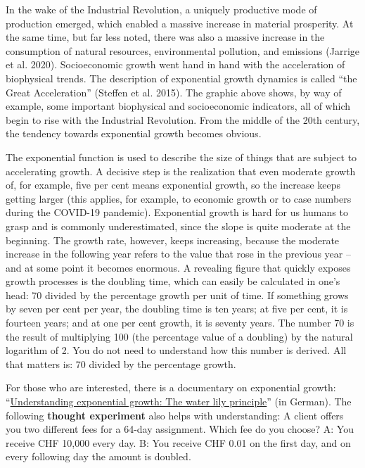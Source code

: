 \documentclass[
  british,
  a4paper,
  DIV=11,
  numbers=noendperiod,
  oneside,
  openany]{scrreprt}
\begin{document}
In the wake of the Industrial Revolution, a uniquely productive mode of
production emerged, which enabled a massive increase in material
prosperity. At the same time, but far less noted, there was also a
massive increase in the consumption of natural resources, environmental
pollution, and emissions (Jarrige et al. 2020). Socioeconomic growth
went hand in hand with the acceleration of biophysical trends. The
description of exponential growth dynamics is called ``the Great
Acceleration'' (Steffen et al. 2015). The graphic above shows, by way of
example, some important biophysical and socioeconomic indicators, all of
which begin to rise with the Industrial Revolution. From the middle of
the 20th century, the tendency towards exponential growth becomes
obvious.

\begin{tcolorbox}[enhanced jigsaw, arc=.35mm, bottomrule=.15mm, bottomtitle=1mm, breakable, colback=white, colbacktitle=quarto-callout-tip-color!10!white, colframe=quarto-callout-tip-color-frame, coltitle=black, left=2mm, leftrule=.75mm, opacityback=0, opacitybacktitle=0.6, rightrule=.15mm, title={Excursus: Exponential growth}, titlerule=0mm, toprule=.15mm, toptitle=1mm]

The exponential function is used to describe the size of things that are
subject to accelerating growth. A decisive step is the realization that
even moderate growth of, for example, five per cent means exponential
growth, so the increase keeps getting larger (this applies, for example,
to economic growth or to case numbers during the COVID-19 pandemic).
Exponential growth is hard for us humans to grasp and is commonly
underestimated, since the slope is quite moderate at the beginning. The
growth rate, however, keeps increasing, because the moderate increase in
the following year refers to the value that rose in the previous year --
and at some point it becomes enormous. A revealing figure that quickly
exposes growth processes is the doubling time, which can easily be
calculated in one's head: 70 divided by the percentage growth per unit
of time. If something grows by seven per cent per year, the doubling
time is ten years; at five per cent, it is fourteen years; and at one
per cent growth, it is seventy years. The number 70 is the result of
multiplying 100 (the percentage value of a doubling) by the natural
logarithm of 2. You do not need to understand how this number is
derived. All that matters is: 70 divided by the percentage growth.

For those who are interested, there is a documentary on exponential
growth:
``\href{https://www.3sat.de/wissen/wissenschaftsdoku/211216-sendung-wido-100.html}{Understanding
exponential growth: The water lily principle}'' (in German). The
following \textbf{thought experiment} also helps with understanding: A
client offers you two different fees for a 64-day assignment. Which fee
do you choose? A: You receive CHF 10,000 every day. B: You receive CHF
0.01 on the first day, and on every following day the amount is doubled.


\end{tcolorbox}
\end{document}
